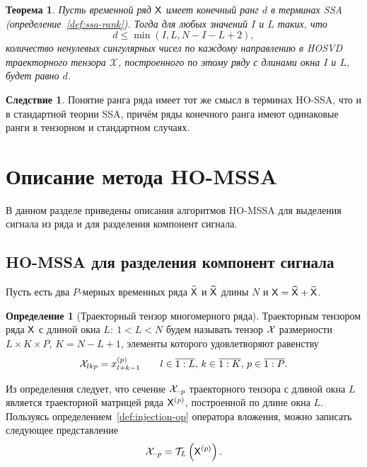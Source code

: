 \documentclass[specialist,
  substylefile=spbu_report.rtx,
subf,href,colorlinks=true, 12pt]{disser}
\theoremstyle{plain}
\newtheorem{theorem}{Теорема}
\theoremstyle{definition}
\newtheorem{definition}{Определение}[section]
\newtheorem*{corollary}{Следствие}
\theoremstyle{remark}
\begin{document}
\begin{theorem}
  \label{state:tens-ssa-rank}
  Пусть временной ряд $\mathsf{X}$ имеет конечный ранг $d$ в терминах
  \emph{SSA} (определение~\ref{def:ssa-rank}).
  Тогда для любых значений $I$ и $L$ таких, что
  \begin{equation}
    d\leqslant\min(I, L, N-I-L+2), \label{eq:tensor-admissability}
  \end{equation}
  количество ненулевых сингулярных чисел по каждому направлению в
  \emph{HOSVD} траекторного тензора $\mathcal{X}$,
  построенного по этому ряду с длинами окна $I$ и $L$, будет равно $d$.
\end{theorem}
\begin{corollary}
  Понятие ранга ряда имеет тот же смысл в терминах HO-SSA, что и в
  стандартной теории SSA, причём ряды
  конечного ранга имеют одинаковые ранги в тензорном и стандартном случаях.
\end{corollary}

\section{Описание метода HO-MSSA}
\label{sec:ho-mssa-desc}
В данном разделе приведены описания алгоритмов HO-MSSA для
выделения сигнала из ряда и для разделения компонент сигнала.

\subsection{HO-MSSA для разделения компонент сигнала}
\label{subsec:ho-mssa-desc-components}
Пусть есть два $P$-мерных временных ряда $\widehat{\mathsf{X}}$ и
$\widetilde{\mathsf{X}}$ длины $N$ и $\mathsf{X} = \widehat{\mathsf{X}} + \widetilde{\mathsf{X}}$.

\begin{definition}[Траекторный тензор многомерного ряда]
  \label{def:trajectory-tensor-mssa}
  Траекторным тензором ряда $\mathsf{X}$ с длиной окна $L:\: 1< L < N$ будем
  называть тензор $\mathcal{X}$
  размерности ${L \times K \times P}$, ${K = N - L + 1}$, элементы
  которого удовлетворяют равенству
  \[
    \mathcal{X}_{lkp}=x_{l+k-1}^{(p)} \qquad l \in \overline{1:L},\, k \in
    \overline{1:K},\, p \in \overline{1:P}.
  \]
\end{definition}
Из определения следует, что сечение $\mathcal{X}_{\cdot \cdot p}$
траекторного тензора с длиной окна $L$
является траекторной матрицей ряда $\mathsf{X}^{(p)}$, построенной по длине окна $L$.
Пользуясь определением~\ref{def:injection-op} оператора вложения,
можно записать следующее представление
\[
  \mathcal{X}_{\cdot \cdot p} = \mathcal{T}_L \left(\mathsf{X}^{(p)}\right).
\]
\end{document}
